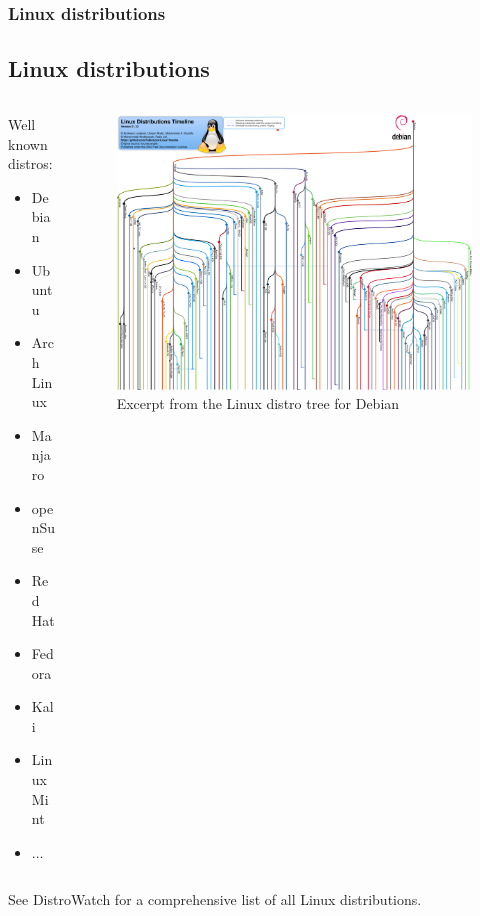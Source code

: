 \begin{frame}
	\frametitle{Linux distributions}
	\subsection{Linux distributions}
	
	\begin{columns}
		\begin{column}{.25\linewidth}
			\begin{block}{Well known distros:}
				\begin{itemize}
					\item Debian
					\item Ubuntu
					\item Arch Linux
					\item Manjaro
					\item openSuse
					\item Red Hat
					\item Fedora
					\item Kali
					\item Linux Mint
					\item $\dots$
				\end{itemize}
			\end{block}
		\end{column}
		\hfill
		\begin{column}{.7\linewidth}
			\begin{figure}
				\includegraphics[width=\linewidth]{../graphics/debian_distro_timeline/debian_distro_timeline.png}
				\caption{Excerpt from the Linux distro tree for Debian \cite{distrograph}}
			\end{figure}
		\end{column}
	\end{columns}
	
	\vfill
	
	\centering
	See DistroWatch\cite{distrowatch} for a comprehensive list of all Linux distributions.
\end{frame}
